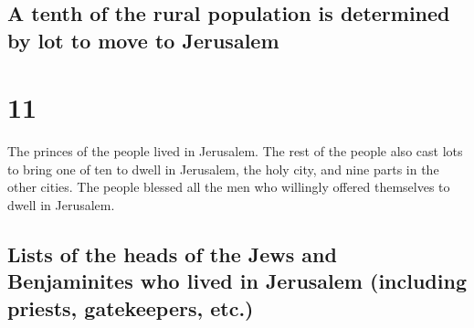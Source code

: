 \hypertarget{a-tenth-of-the-rural-population-is-determined-by-lot-to-move-to-jerusalem}{%
\subsection{A tenth of the rural population is determined by lot to move
to
Jerusalem}\label{a-tenth-of-the-rural-population-is-determined-by-lot-to-move-to-jerusalem}}

\hypertarget{section-10}{%
\section{11}\label{section-10}}

 The princes of the people lived in Jerusalem. The rest of
the people also cast lots to bring one of ten to dwell in Jerusalem, the
holy city, and nine parts in the other cities.  The people
blessed all the men who willingly offered themselves to dwell in
Jerusalem.

\hypertarget{lists-of-the-heads-of-the-jews-and-benjaminites-who-lived-in-jerusalem-including-priests-gatekeepers-etc.}{%
\subsection{Lists of the heads of the Jews and Benjaminites who lived in
Jerusalem (including priests, gatekeepers,
etc.)}\label{lists-of-the-heads-of-the-jews-and-benjaminites-who-lived-in-jerusalem-including-priests-gatekeepers-etc.}}

